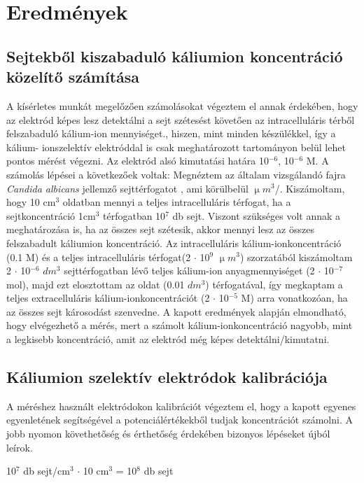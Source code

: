 \chapter{Eredmények}
\pagestyle{headings}


\section{Sejtekből kiszabaduló káliumion koncentráció közelítő számítása}
A kísérletes munkát megelőzően számolásokat végeztem el annak érdekében, hogy az elektród képes lesz detektálni a sejt szétesést követően az intracelluláris térből felszabaduló kálium-ion mennyiséget., hiszen, mint minden készülékkel, így a kálium- ionszelektív elektróddal is csak meghatározott tartományon belül lehet pontos mérést végezni. Az elektród alsó kimutatási határa 10$^{-6}$, 10$^{-6}$ M. 
 A számolás lépései a következőek voltak: 
Megnéztem az általam vizsgálandó fajra \emph{Candida albicans} jellemző sejttérfogatot \cite{chaffin1984relationship}, ami körülbelül $\upmu m^3$/. Kiszámoltam, hogy 10 cm$^3$  oldatban mennyi a teljes intracelluláris térfogat, ha a sejtkoncentráció 1cm$^3$ térfogatban 10$^7$ db sejt. Viszont szükséges volt annak a meghatározása is, ha az összes sejt szétesik, akkor mennyi lesz az összes felszabadult káliumion koncentráció. Az intracelluláris kálium-ionkoncentráció (0.1 M) és a teljes intracelluláris térfogat(2 $\cdot$ 10$^9$ $\upmu m^3$) szorzatából kiszámoltam 2 $\cdot$ 10$^{-6}$ $dm^3$ sejttérfogatban lévő teljes kálium-ion anyagmennyiséget (2 $\cdot$ 10$^{-7}$ mol), majd ezt elosztottam az oldat (0.01 $dm^3$) térfogatával, így megkaptam a teljes extracelluláris kálium-ionkoncentrációt (2 $\cdot$ 10$^{-5}$ M) arra vonatkozóan, ha az összes sejt károsodást szenvedne. A kapott eredmények alapján elmondható, hogy elvégezhető a mérés, mert a számolt kálium-ionkoncentráció nagyobb, mint a legkisebb koncentráció, amit az elektród még képes detektálni/kimutatni. 

\section{Káliumion szelektív elektródok kalibrációja}
A méréshez használt elektródokon kalibrációt végeztem el, hogy a kapott egyenes egyenletének segítségével a potenciálértékekből tudjak koncentrációt számolni. A jobb nyomon követhetőség és érthetőség érdekében bizonyos lépéseket újból leírok.



10$^7$ db sejt/cm$^3$ $\cdot$ 10 cm$^3$ = 10$^8$ db sejt

